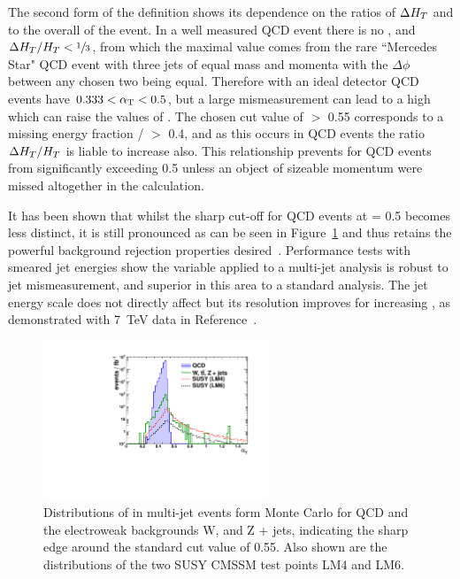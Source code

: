 The second form of the definition shows its dependence on the ratios of $\Delta H_{T}$ and \mht to the overall \HT of the event. In a well measured QCD event there is no \mht, and $\Delta H_{T} / H_{T} < \sfrac{1}{3}$, from which the maximal value comes from the rare ``Mercedes Star" QCD event with three jets of equal mass and momenta with the $\Delta \phi$ between any chosen two being equal. Therefore with an ideal detector QCD events have $0.333 < \alpha_{\text{T}} < 0.5$, but a large mismeasurement can lead to a high \mht which can raise the values of \alt. The chosen cut value of \alt $>$ 0.55 corresponds to a missing energy fraction \mht / \HT $>$ 0.4, and as this occurs in QCD events the ratio $\Delta H_{T} / H_{T}$ is liable to increase also. This relationship prevents \alt for QCD events from significantly exceeding 0.5 unless an object of sizeable momentum were missed altogether in the calculation. 

It has been shown that whilst the sharp cut-off for QCD events at \alt = 0.5 becomes less distinct, it is still pronounced as can be seen in Figure~\ref{fig:atedge} and thus retains the powerful background rejection properties desired~\cite{an2009_56}. Performance tests with smeared jet energies show the \alt variable applied to a multi-jet analysis is robust to jet mismeasurement, and superior in this area to a standard \met analysis. The jet energy scale does not directly affect \alt but its resolution improves for increasing \HT, as demonstrated with 7~TeV data in Reference~\cite{an2010_119}. 

\begin{figure}[htbp]
\begin{center}
\includegraphics[width=0.6\textwidth]{Figures/AlphaT/ThesisATPlot}
\caption[Distributions of \alt in multi-jet events form Monte Carlo for QCD and the electroweak backgrounds W, \tto and Z + jets, indicating the sharp edge around the standard cut value of 0.55.]{\label{fig:atedge}Distributions of \alt in multi-jet events form Monte Carlo for QCD and the electroweak backgrounds W, \tto and Z + jets, indicating the sharp edge around the standard cut value of 0.55. Also shown are the distributions of the two SUSY CMSSM test points LM4 and LM6.}
\end{center}
\end{figure}


